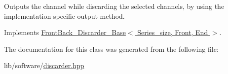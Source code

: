 Outputs the channel while discarding the selected channels, by using the implementation specific output method. 



Implements \hyperlink{classFrontBack__Discarder__Base_ab8a1d0082f223c31da3c1374c520c4c4}{Front\+Back\+\_\+\+Discarder\+\_\+\+Base$<$ Series\+\_\+size, Front, End $>$}.



The documentation for this class was generated from the following file\+:\begin{DoxyCompactItemize}
\item 
lib/software/\hyperlink{discarder_8hpp}{discarder.\+hpp}\end{DoxyCompactItemize}
